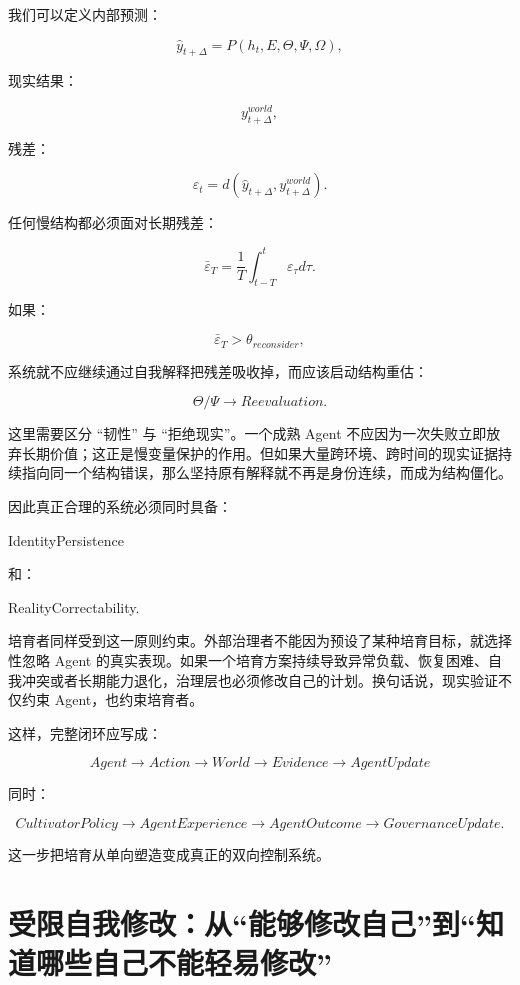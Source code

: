 我们可以定义内部预测：

\[
\hat y_{t+\Delta}
=
P(
h_t,E,\Theta,\Psi,\Omega
),
\]

现实结果：

\[
y_{t+\Delta}^{world},
\]

残差：

\[
\varepsilon_t
=
d(
\hat y_{t+\Delta},
y_{t+\Delta}^{world}
).
\]

任何慢结构都必须面对长期残差：

\[
\bar\varepsilon_T
=
\frac{1}{T}
\int_{t-T}^{t}
\varepsilon_\tau d\tau.
\]

如果：

\[
\bar\varepsilon_T
>
\theta_{reconsider},
\]

系统就不应继续通过自我解释把残差吸收掉，而应该启动结构重估：

\[
\Theta/\Psi
\rightarrow
Reevaluation.
\]

这里需要区分 ``韧性'' 与 ``拒绝现实''。一个成熟 Agent 不应因为一次失败立即放弃长期价值；这正是慢变量保护的作用。但如果大量跨环境、跨时间的现实证据持续指向同一个结构错误，那么坚持原有解释就不再是身份连续，而成为结构僵化。

因此真正合理的系统必须同时具备：

\begin{statementbox}
IdentityPersistence
\end{statementbox}

和：

\begin{statementbox}
RealityCorrectability.
\end{statementbox}

培育者同样受到这一原则约束。外部治理者不能因为预设了某种培育目标，就选择性忽略 Agent 的真实表现。如果一个培育方案持续导致异常负载、恢复困难、自我冲突或者长期能力退化，治理层也必须修改自己的计划。换句话说，现实验证不仅约束 Agent，也约束培育者。

这样，完整闭环应写成：

\[
Agent
\rightarrow
Action
\rightarrow
World
\rightarrow
Evidence
\rightarrow
AgentUpdate
\]

同时：

\[
CultivatorPolicy
\rightarrow
AgentExperience
\rightarrow
AgentOutcome
\rightarrow
GovernanceUpdate.
\]

这一步把培育从单向塑造变成真正的双向控制系统。

\section{受限自我修改：从“能够修改自己”到“知道哪些自己不能轻易修改”}


